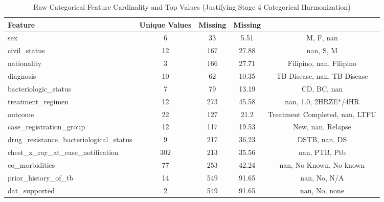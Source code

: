 \begin{table}[htbp]

\caption{Raw Categorical Feature Cardinality and Top Values (Justifying Stage 4 Categorical Harmonization)}
\label{tab:categorical_cardinality_summary}
\begin{tabular}{lcccc}

\toprule

Feature & Unique Values & Missing & Missing \\%

\midrule

sex & 6 & 33 & 5.51 & M, F, nan \\
civil\_status & 12 & 167 & 27.88 & nan, S, M \\
nationality & 3 & 166 & 27.71 & Filipino, nan,  Filipino \\
diagnosis & 10 & 62 & 10.35 & TB Disease, nan, TB Disease  \\
bacteriologic\_status & 7 & 79 & 13.19 & CD, BC, nan \\
treatment\_regimen & 12 & 273 & 45.58 & nan, 1.0, 2HRZE*/4HR \\
outcome & 22 & 127 & 21.2 & Treatment Completed, nan, LTFU \\
case\_registration\_group & 12 & 117 & 19.53 & New, nan, Relapse \\
drug\_resistance\_bacteriological\_status & 9 & 217 & 36.23 & DSTB, nan, DS \\
chest\_x\_ray\_at\_case\_notification & 302 & 213 & 35.56 & nan, PTB, Ptb \\
co\_morbidities & 77 & 253 & 42.24 & nan, No Known, No known \\
prior\_history\_of\_tb & 14 & 549 & 91.65 & nan, No, N/A  \\
dat\_supported & 2 & 549 & 91.65 & nan, No, none \\

\bottomrule

\end{tabular}

\end{table}